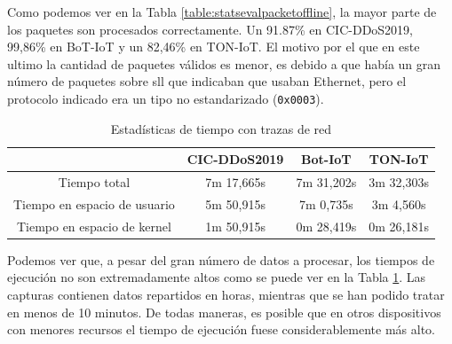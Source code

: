 Como podemos ver en la Tabla \ref{table:statsevalpacketoffline}, la mayor parte de los paquetes son procesados correctamente. Un 91.87\% en CIC-DDoS2019, 99,86\% en BoT-IoT y un 82,46\% en TON-IoT. El motivo por el que en este ultimo la cantidad de paquetes válidos es menor, es debido a que había un gran número de paquetes sobre \acrshort{sll} que indicaban que usaban Ethernet, pero el protocolo indicado  era un tipo no estandarizado (\texttt{0x0003}).

\begin{table}[H]
    \begin{center}
        \begin{tabular}{|c | c c c |} 
            \hline
            & \textbf{CIC-DDoS2019} & \textbf{Bot-IoT} & \textbf{TON-IoT} \\
            \hline
            Tiempo total                 & 7m 17,665s & 7m 31,202s & 3m 32,303s \\
            Tiempo en espacio de usuario & 5m 50,915s & 7m  0,735s & 3m  4,560s \\
            Tiempo en espacio de kernel  & 1m 50,915s & 0m 28,419s & 0m 26,181s \\
            \hline
        \end{tabular}
    \end{center}
    \caption{Estadísticas de tiempo con trazas de red}
    \label{table:statstimeoffline}
\end{table}

Podemos ver que, a pesar del gran número de datos a procesar, los tiempos de ejecución no son extremadamente altos como se puede ver en la Tabla \ref{table:statstimeoffline}. Las capturas contienen datos repartidos en horas, mientras que se han podido tratar en menos de 10 minutos. De todas maneras, es posible que en otros dispositivos con menores recursos el tiempo de ejecución fuese considerablemente más alto.

\begin{table}[H]
    \begin{center}
    \end{center}
    \caption{Archivos generados con trazas de red}
    \label{table:generatedfilesoffline}
\end{table}

